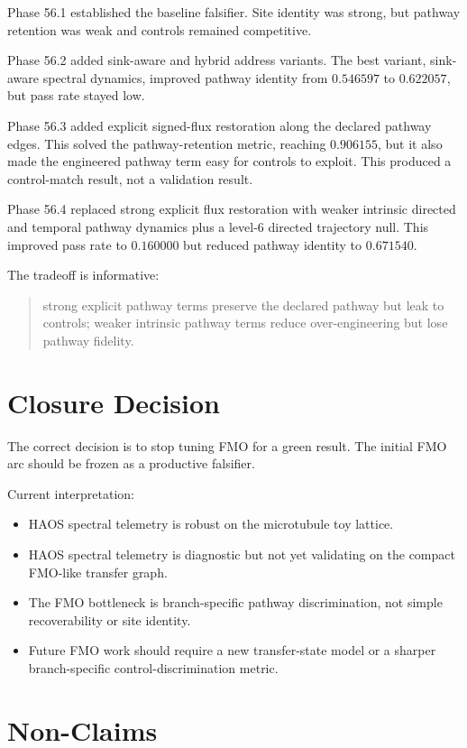 \documentclass[11pt]{article}
\begin{document}
Phase 56.1 established the baseline falsifier. Site identity was strong, but pathway retention was weak and controls remained competitive.

Phase 56.2 added sink-aware and hybrid address variants. The best variant, sink-aware spectral dynamics, improved pathway identity from $0.546597$ to $0.622057$, but pass rate stayed low.

Phase 56.3 added explicit signed-flux restoration along the declared pathway edges. This solved the pathway-retention metric, reaching $0.906155$, but it also made the engineered pathway term easy for controls to exploit. This produced a control-match result, not a validation result.

Phase 56.4 replaced strong explicit flux restoration with weaker intrinsic directed and temporal pathway dynamics plus a level-6 directed trajectory null. This improved pass rate to $0.160000$ but reduced pathway identity to $0.671540$.

The tradeoff is informative:
\begin{quote}
strong explicit pathway terms preserve the declared pathway but leak to controls; weaker intrinsic pathway terms reduce over-engineering but lose pathway fidelity.
\end{quote}

\section{Closure Decision}

The correct decision is to stop tuning FMO for a green result. The initial FMO arc should be frozen as a productive falsifier.

Current interpretation:
\begin{itemize}
\item HAOS spectral telemetry is robust on the microtubule toy lattice.
\item HAOS spectral telemetry is diagnostic but not yet validating on the compact FMO-like transfer graph.
\item The FMO bottleneck is branch-specific pathway discrimination, not simple recoverability or site identity.
\item Future FMO work should require a new transfer-state model or a sharper branch-specific control-discrimination metric.
\end{itemize}

\section{Non-Claims}
\end{document}
